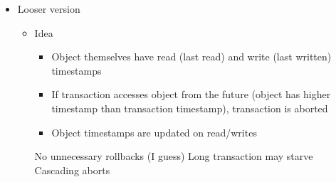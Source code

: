 \begin{itemize}
    \item Looser version
        \begin{itemize}
            \item Idea
                \begin{itemize}
                    \item Object themselves have read (last read) and write (last written) timestamps
                    \item If transaction accesses object from the future (object has higher timestamp than transaction timestamp), transaction is aborted
                    \item Object timestamps are updated on read/writes
                \end{itemize}
            \ipro No unnecessary rollbacks (I guess)
            \icon Long transaction may starve
            \icon Cascading aborts
        \end{itemize}
\end{itemize}
